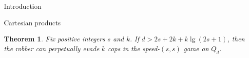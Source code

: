 \documentclass[12pt]{amsart}
\newtheorem{theorem}[lemma]{Theorem}
\theoremstyle{definition}
\begin{document}
\begin{section}{Introduction}
\begin{section}{Cartesian products}

\begin{theorem} \label{thm:speed_s_hypercube_lower_bound}
Fix positive integers $s$ and $k$.  If $d > 2s+2k+k\lg(2s+1)$, then the robber can perpetually evade $k$ cops in the speed-$(s,s)$ game on $Q_d$.
\end{theorem}


\end{section}
\end{section}
\end{document}
